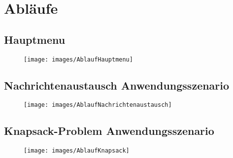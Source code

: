 \chapter{Abläufe}

\section{Hauptmenu}
\begin{figure}[htbp]
	\centering
	\texttt{[image: images/AblaufHauptmenu]}
\end{figure}
\newpage

\section{Nachrichtenaustausch Anwendungsszenario}
\begin{figure}[htbp]
	\centering
	\texttt{[image: images/AblaufNachrichtenaustausch]}
\end{figure}
\newpage

\section{Knapsack-Problem Anwendungsszenario}
\begin{figure}[htbp]
	\centering
	\texttt{[image: images/AblaufKnapsack]}
\end{figure}
\newpage